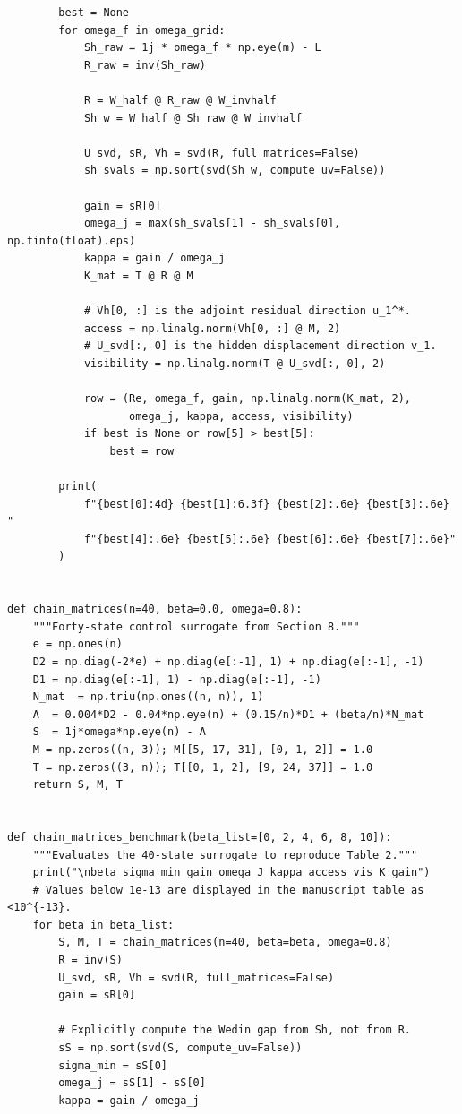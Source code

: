 \documentclass[review]{siamart220329}
\theoremstyle{definition}
\theoremstyle{remark}
\begin{document}
\begin{verbatim}
        best = None
        for omega_f in omega_grid:
            Sh_raw = 1j * omega_f * np.eye(m) - L
            R_raw = inv(Sh_raw)

            R = W_half @ R_raw @ W_invhalf
            Sh_w = W_half @ Sh_raw @ W_invhalf

            U_svd, sR, Vh = svd(R, full_matrices=False)
            sh_svals = np.sort(svd(Sh_w, compute_uv=False))

            gain = sR[0]
            omega_j = max(sh_svals[1] - sh_svals[0], np.finfo(float).eps)
            kappa = gain / omega_j
            K_mat = T @ R @ M

            # Vh[0, :] is the adjoint residual direction u_1^*.
            access = np.linalg.norm(Vh[0, :] @ M, 2)
            # U_svd[:, 0] is the hidden displacement direction v_1.
            visibility = np.linalg.norm(T @ U_svd[:, 0], 2)

            row = (Re, omega_f, gain, np.linalg.norm(K_mat, 2),
                   omega_j, kappa, access, visibility)
            if best is None or row[5] > best[5]:
                best = row

        print(
            f"{best[0]:4d} {best[1]:6.3f} {best[2]:.6e} {best[3]:.6e} "
            f"{best[4]:.6e} {best[5]:.6e} {best[6]:.6e} {best[7]:.6e}"
        )


def chain_matrices(n=40, beta=0.0, omega=0.8):
    """Forty-state control surrogate from Section 8."""
    e = np.ones(n)
    D2 = np.diag(-2*e) + np.diag(e[:-1], 1) + np.diag(e[:-1], -1)
    D1 = np.diag(e[:-1], 1) - np.diag(e[:-1], -1)
    N_mat  = np.triu(np.ones((n, n)), 1)
    A  = 0.004*D2 - 0.04*np.eye(n) + (0.15/n)*D1 + (beta/n)*N_mat
    S  = 1j*omega*np.eye(n) - A
    M = np.zeros((n, 3)); M[[5, 17, 31], [0, 1, 2]] = 1.0
    T = np.zeros((3, n)); T[[0, 1, 2], [9, 24, 37]] = 1.0
    return S, M, T


def chain_matrices_benchmark(beta_list=[0, 2, 4, 6, 8, 10]):
    """Evaluates the 40-state surrogate to reproduce Table 2."""
    print("\nbeta sigma_min gain omega_J kappa access vis K_gain")
    # Values below 1e-13 are displayed in the manuscript table as <10^{-13}.
    for beta in beta_list:
        S, M, T = chain_matrices(n=40, beta=beta, omega=0.8)
        R = inv(S)
        U_svd, sR, Vh = svd(R, full_matrices=False)
        gain = sR[0]

        # Explicitly compute the Wedin gap from Sh, not from R.
        sS = np.sort(svd(S, compute_uv=False))
        sigma_min = sS[0]
        omega_j = sS[1] - sS[0]
        kappa = gain / omega_j


\end{verbatim}
\end{document}

